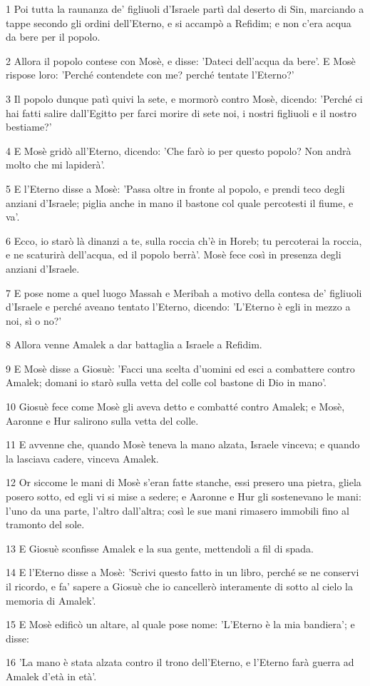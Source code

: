 \par 1 Poi tutta la raunanza de' figliuoli d'Israele partì dal deserto di Sin, marciando a tappe secondo gli ordini dell'Eterno, e si accampò a Refidim; e non c'era acqua da bere per il popolo.
\par 2 Allora il popolo contese con Mosè, e disse: 'Dateci dell'acqua da bere'. E Mosè rispose loro: 'Perché contendete con me? perché tentate l'Eterno?'
\par 3 Il popolo dunque patì quivi la sete, e mormorò contro Mosè, dicendo: 'Perché ci hai fatti salire dall'Egitto per farci morire di sete noi, i nostri figliuoli e il nostro bestiame?'
\par 4 E Mosè gridò all'Eterno, dicendo: 'Che farò io per questo popolo? Non andrà molto che mi lapiderà'.
\par 5 E l'Eterno disse a Mosè: 'Passa oltre in fronte al popolo, e prendi teco degli anziani d'Israele; piglia anche in mano il bastone col quale percotesti il fiume, e va'.
\par 6 Ecco, io starò là dinanzi a te, sulla roccia ch'è in Horeb; tu percoterai la roccia, e ne scaturirà dell'acqua, ed il popolo berrà'. Mosè fece così in presenza degli anziani d'Israele.
\par 7 E pose nome a quel luogo Massah e Meribah a motivo della contesa de' figliuoli d'Israele e perché aveano tentato l'Eterno, dicendo: 'L'Eterno è egli in mezzo a noi, sì o no?'
\par 8 Allora venne Amalek a dar battaglia a Israele a Refidim.
\par 9 E Mosè disse a Giosuè: 'Facci una scelta d'uomini ed esci a combattere contro Amalek; domani io starò sulla vetta del colle col bastone di Dio in mano'.
\par 10 Giosuè fece come Mosè gli aveva detto e combatté contro Amalek; e Mosè, Aaronne e Hur salirono sulla vetta del colle.
\par 11 E avvenne che, quando Mosè teneva la mano alzata, Israele vinceva; e quando la lasciava cadere, vinceva Amalek.
\par 12 Or siccome le mani di Mosè s'eran fatte stanche, essi presero una pietra, gliela posero sotto, ed egli vi si mise a sedere; e Aaronne e Hur gli sostenevano le mani: l'uno da una parte, l'altro dall'altra; così le sue mani rimasero immobili fino al tramonto del sole.
\par 13 E Giosuè sconfisse Amalek e la sua gente, mettendoli a fil di spada.
\par 14 E l'Eterno disse a Mosè: 'Scrivi questo fatto in un libro, perché se ne conservi il ricordo, e fa' sapere a Giosuè che io cancellerò interamente di sotto al cielo la memoria di Amalek'.
\par 15 E Mosè edificò un altare, al quale pose nome: 'L'Eterno è la mia bandiera'; e disse:
\par 16 'La mano è stata alzata contro il trono dell'Eterno, e l'Eterno farà guerra ad Amalek d'età in età'.

